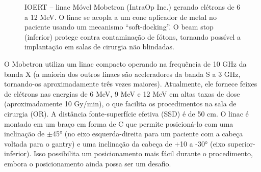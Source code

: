 \documentclass[11pt,a4paper]{article}
\begin{document}
	\begin{figure}[h]
		\centering
		\caption{IOERT -- linac Móvel Mobetron (IntraOp Inc.) gerando elétrons de 6 a 12 MeV. O linac se acopla a um cone aplicador de metal no paciente usando um mecanismo “soft-docking”. O beam stop (inferior) protege contra contaminação de fótons, tornando possível a implantação em salas de cirurgia não blindadas.}
		\label{fig:iortMobile}
	\end{figure}

	O Mobetron utiliza um linac compacto operando na frequência de 10 GHz da banda X (a maioria dos outros linacs são aceleradores da banda S a 3 GHz, tornando-os aproximadamente três vezes maiores). Atualmente, ele fornece feixes de elétrons nas energias de 6 MeV, 9 MeV e 12 MeV em altas taxas de dose (aproximadamente 10 Gy/min), o que facilita os procedimentos na sala de cirurgia (OR). A distância fonte-superfície efetiva (SSD) é de 50 cm. O linac é montado em um braço em forma de C que permite posicioná-lo com uma inclinação de $\pm$\ang{45} (no eixo esquerda-direita para um paciente com a cabeça voltada para o gantry) e uma inclinação da cabeça de $+$10 a -\ang{30} (eixo superior-inferior). Isso possibilita um posicionamento mais fácil durante o procedimento, embora o posicionamento ainda possa ser um desafio. 
\end{document}
